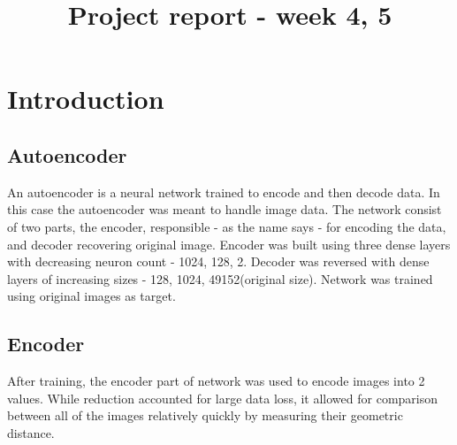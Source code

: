 

\title{Project report - week 4, 5}


	\maketitle
	\section{Introduction}
		\subsection{Autoencoder}
			An autoencoder is a neural network trained to encode and then decode data.
			In this case the autoencoder was meant to handle image data.
			The network consist of two parts, the encoder, responsible - as the name says - for encoding the data, and decoder recovering original image.
			Encoder was built using three dense layers with decreasing neuron count - 1024, 128, 2.
			Decoder was reversed with dense layers of increasing sizes - 128, 1024, 49152(original size).
			Network was trained using original images as target.
		\subsection{Encoder}
			After training, the encoder part of network was used to encode images into 2 values.
			While reduction accounted for large data loss, it allowed for comparison between all of the images relatively quickly by measuring their geometric distance.
